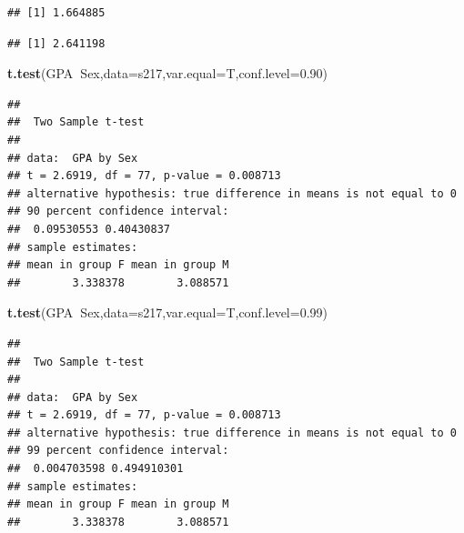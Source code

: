 \documentclass[]{book}
\newenvironment{Shaded}{\begin{snugshade}}{\end{snugshade}}
\newcommand{\KeywordTok}[1]{\textcolor[rgb]{0.13,0.29,0.53}{\textbf{#1}}}
\newcommand{\DataTypeTok}[1]{\textcolor[rgb]{0.13,0.29,0.53}{#1}}
\newcommand{\DecValTok}[1]{\textcolor[rgb]{0.00,0.00,0.81}{#1}}
\newcommand{\FloatTok}[1]{\textcolor[rgb]{0.00,0.00,0.81}{#1}}
\newcommand{\CommentTok}[1]{\textcolor[rgb]{0.56,0.35,0.01}{\textit{#1}}}
\newcommand{\OperatorTok}[1]{\textcolor[rgb]{0.81,0.36,0.00}{\textbf{#1}}}
\newcommand{\NormalTok}[1]{#1}
\theoremstyle{definition}
\theoremstyle{definition}
\theoremstyle{remark}
\begin{document}
\begin{verbatim}
## [1] 1.664885
\end{verbatim}

\begin{Shaded}
\end{Shaded}

\begin{verbatim}
## [1] 2.641198
\end{verbatim}

\begin{Shaded}
\begin{Highlighting}[]
\KeywordTok{t.test}\NormalTok{(GPA}\OperatorTok{~}\NormalTok{Sex,}\DataTypeTok{data=}\NormalTok{s217,}\DataTypeTok{var.equal=}\NormalTok{T,}\DataTypeTok{conf.level=}\FloatTok{0.90}\NormalTok{)}
\end{Highlighting}
\end{Shaded}

\begin{verbatim}
## 
##  Two Sample t-test
## 
## data:  GPA by Sex
## t = 2.6919, df = 77, p-value = 0.008713
## alternative hypothesis: true difference in means is not equal to 0
## 90 percent confidence interval:
##  0.09530553 0.40430837
## sample estimates:
## mean in group F mean in group M 
##        3.338378        3.088571
\end{verbatim}

\begin{Shaded}
\begin{Highlighting}[]
\KeywordTok{t.test}\NormalTok{(GPA}\OperatorTok{~}\NormalTok{Sex,}\DataTypeTok{data=}\NormalTok{s217,}\DataTypeTok{var.equal=}\NormalTok{T,}\DataTypeTok{conf.level=}\FloatTok{0.99}\NormalTok{)}
\end{Highlighting}
\end{Shaded}

\begin{verbatim}
## 
##  Two Sample t-test
## 
## data:  GPA by Sex
## t = 2.6919, df = 77, p-value = 0.008713
## alternative hypothesis: true difference in means is not equal to 0
## 99 percent confidence interval:
##  0.004703598 0.494910301
## sample estimates:
## mean in group F mean in group M 
##        3.338378        3.088571
\end{verbatim}
\end{document}
